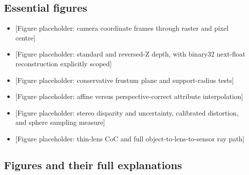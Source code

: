 \subsection{Essential figures}\label{appendix-a2b71a18f5a2-essential-figures}

\begin{itemize}
\tightlist
\item
  {[}Figure placeholder: camera coordinate frames through raster and pixel centre{]}
\item
  {[}Figure placeholder: standard and reversed-Z depth, with binary32 next-float reconstruction explicitly scoped{]}
\item
  {[}Figure placeholder: conservative frustum plane and support-radius tests{]}
\item
  {[}Figure placeholder: affine versus perspective-correct attribute interpolation{]}
\item
  {[}Figure placeholder: stereo disparity and uncertainty, calibrated distortion, and sphere sampling measure{]}
\item
  {[}Figure placeholder: thin-lens CoC and full object-to-lens-to-sensor ray path{]}
\end{itemize}

\subsection{Figures and their full explanations}\label{appendix-a2b71a18f5a2-figures-and-their-full-explanations}

